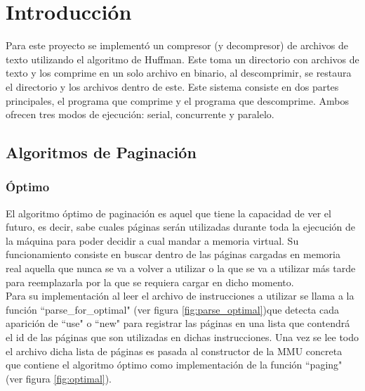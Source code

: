 \documentclass{report}
\begin{document}


\tableofcontents

\chapter{Introducción}\label{intro}

Para este proyecto se implementó un compresor (y decompresor) de archivos de texto utilizando el algoritmo de Huffman.
Este toma un directorio con archivos de texto y los comprime en un solo archivo en binario, al descomprimir, se restaura el directorio y los archivos dentro de este.
Este sistema consiste en dos partes principales,  el programa que comprime y el programa que descomprime.
Ambos ofrecen tres modos de ejecución: serial, concurrente y paralelo.

\section {Algoritmos de Paginación}
\subsection{Óptimo}
El algoritmo óptimo de paginación es aquel que tiene la capacidad de ver el futuro, es decir, sabe cuales páginas serán utilizadas durante toda la ejecución de la máquina para poder decidir a cual mandar a memoria virtual. Su funcionamiento consiste en buscar dentro de las páginas cargadas en memoria real aquella que nunca se va a volver a utilizar o la que se va a utilizar más tarde para reemplazarla por la que se requiera cargar en dicho momento. \\


Para su implementación al leer el archivo de instrucciones a utilizar se llama a la función ``parse\_for\_optimal" (ver figura \ref{fig:parse_optimal})que detecta cada aparición de ``use" o ``new" para registrar las páginas en una lista que contendrá el id de las páginas que son utilizadas en dichas instrucciones. Una vez se lee todo el archivo dicha lista de páginas es pasada al constructor de la MMU concreta que contiene el algoritmo óptimo como implementación de la función ``paging" (ver figura \ref{fig:optimal}).
\end{document}
